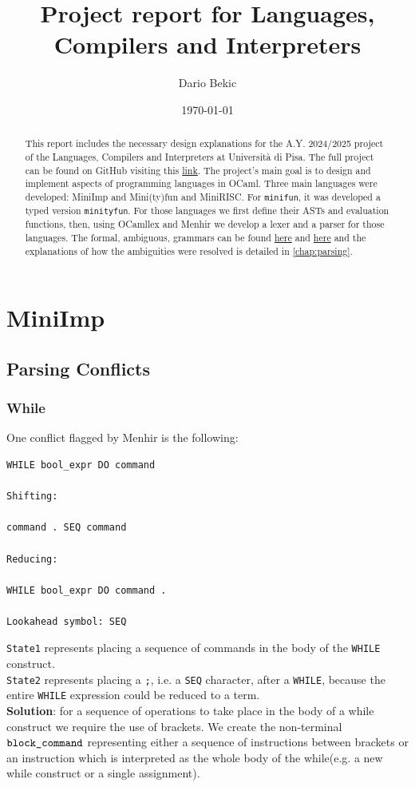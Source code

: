 \documentclass[a4paper,11pt]{report}
\title{Project report for Languages, Compilers and Interpreters}
\author{Dario Bekic}
\date{\today}
\begin{document}
\maketitle
\tableofcontents

\begin{abstract}
This report includes the necessary design explanations for the A.Y. 2024/2025 project of the Languages, Compilers and Interpreters at Università di Pisa.
The full project can be found on GitHub visiting this \href{https://github.com/wuacs/unipi-lci/tree/main/project}{link}.
The project's main goal is to design and implement aspects of programming languages in OCaml. Three main languages were developed: MiniImp and Mini(ty)fun and MiniRISC. For \verb|minifun|, it was developed a typed version \verb|minityfun|. For those languages we first define their ASTs and evaluation functions, then, using OCamllex and Menhir we develop a lexer and a parser for those languages. The formal, ambiguous, grammars can be found \href{https://lceragioli.github.io/pages/Slides/semantics.pdf}{here} and \href{https://lceragioli.github.io/pages/Slides/types.pdf}{here} and the explanations of how the ambiguities were resolved is detailed in \autoref{chap:parsing}.
\end{abstract}

\section{MiniImp}\label{Section::MiniImp}


\subsection{Parsing Conflicts}

\subsubsection{While}

	One conflict flagged by Menhir is the following:
	\begin{lstlisting}[caption={Shift-reduce conflict with while term}, captionpos = b]
WHILE bool_expr DO command

Shifting: 

command . SEQ command

Reducing:

WHILE bool_expr DO command .

Lookahead symbol: SEQ
	\end{lstlisting}
	\verb|State1| represents placing a sequence of commands in the body of the \verb|WHILE| construct.\\
	\verb|State2| represents placing a \verb|;|, i.e. a \verb|SEQ| character, after a \verb|WHILE|, because the entire \verb|WHILE| expression could be reduced to a term.\\
	\textbf{Solution}: for a sequence of operations to take place in the body of a while construct we require the use of brackets. We create the non-terminal $\verb|block_command|$ representing either a sequence of instructions between brackets or an instruction which is interpreted as the whole body of the while(e.g. a new while construct or a single assignment).
	
\end{document}
